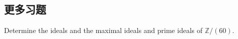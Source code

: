 


\subsection{更多习题}
\setcounter{pb}{19}
\begin{problem}
    Determine the ideals and the maximal ideals and prime ideals of $ \mathbb{Z}/(60) $.
\end{problem}

